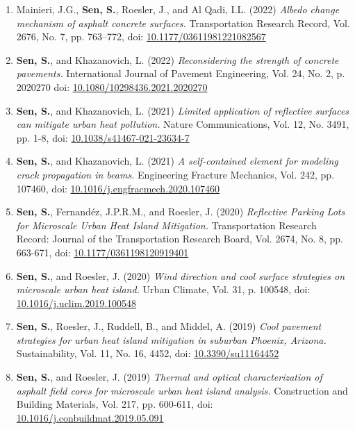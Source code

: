 \documentclass[12pt]{article}
\begin{document}
\begin{enumerate}[label=(J\arabic*)]
	\item Mainieri, J.G., \textbf{Sen, S.}, Roesler, J., and Al Qadi, I.L. (2022) \textit{Albedo change mechanism of asphalt concrete surfaces.} Transportation Research Record, Vol. 2676, No. 7, pp. 763–772, doi: \href{https://doi.org/10.1177/036119812210825670}{10.1177/03611981221082567}
	\item \textbf{Sen, S.}, and Khazanovich, L. (2022) \textit{Reconsidering the strength of concrete pavements.} International Journal of Pavement Engineering, Vol. 24, No. 2, p. 2020270 doi: \href{https://doi.org/10.1080/10298436.2021.2020270}{10.1080/10298436.2021.2020270}
	\item \textbf{Sen, S.}, and Khazanovich, L. (2021) \textit{Limited application of reflective surfaces can mitigate urban heat pollution.} Nature Communications, Vol. 12, No. 3491, pp. 1-8, doi: \href{https://doi.org/10.1038/s41467-021-23634-7}{10.1038/s41467-021-23634-7}
	\item \textbf{Sen, S.}, and Khazanovich, L. (2021) \textit{A self-contained element for modeling crack propagation in beams.} Engineering Fracture Mechanics, Vol. 242, pp. 107460, doi: \href{https://doi.org/10.1016/j.engfracmech.2020.107460}{10.1016/j.engfracmech.2020.107460}			
	\item \textbf{Sen, S.}, Fernand\'ez, J.P.R.M., and Roesler, J. (2020) \textit{Reflective Parking Lots for Microscale Urban Heat Island Mitigation.}  Transportation Research Record: Journal of the Transportation Research Board, Vol. 2674, No. 8, pp. 663-671, doi: \href{https://doi.org/10.1177/0361198120919401}{10.1177/0361198120919401}	
		\item \textbf{Sen, S.}, and Roesler, J. (2020) \textit{Wind direction and cool surface strategies on microscale urban heat island.}  Urban Climate, Vol. 31, p. 100548, doi: \href{https://doi.org/10.1016/j.uclim.2019.100548}{10.1016/j.uclim.2019.100548}
	\item \textbf{Sen, S.}, Roesler, J., Ruddell, B., and Middel, A. (2019) \textit{Cool pavement strategies for urban heat island mitigation in suburban Phoenix, Arizona.}  Sustainability, Vol. 11, No. 16, 4452, doi: \href{https://doi.org/10.3390/su11164452}{10.3390/su11164452}
		\item \textbf{Sen, S.}, and Roesler, J. (2019) \textit{Thermal and optical characterization of asphalt field cores for microscale urban heat island analysis.}  Construction and Building Materials, Vol. 217, pp. 600-611, doi: \href{https://doi.org/10.1016/j.conbuildmat.2019.05.091}{10.1016/j.conbuildmat.2019.05.091}

\end{enumerate}
\end{document}

